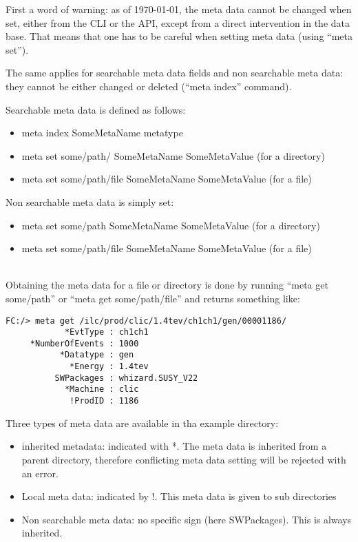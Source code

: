 \documentclass[a4paper,12pt]{article}
\begin{document}
First a word of warning: as of \today, the meta data cannot be changed when set,
either from the CLI or the API, except from a direct intervention in the data
base. That means that one has to be careful when setting meta data (using ``meta
set'').

The same applies for searchable meta data fields and non searchable meta data:
they cannot be either changed or deleted (``meta index'' command). 

Searchable meta data is defined as follows:
\begin{itemize}
  \item meta index SomeMetaName metatype 
  \item meta set some/path/ SomeMetaName SomeMetaValue (for a directory)
  \item meta set some/path/file SomeMetaName SomeMetaValue (for a file)
\end{itemize}

Non searchable meta data is simply set:
\begin{itemize}
  \item meta set some/path SomeMetaName SomeMetaValue (for a directory)
  \item meta set some/path/file SomeMetaName SomeMetaValue (for a file)
\end{itemize}

~\\

Obtaining the meta data for a file or directory is done by running ``meta get
some/path'' or ``meta get some/path/file'' and returns something like:
\begin{lstlisting}
FC:/> meta get /ilc/prod/clic/1.4tev/ch1ch1/gen/00001186/
            *EvtType : ch1ch1
     *NumberOfEvents : 1000
           *Datatype : gen
             *Energy : 1.4tev
          SWPackages : whizard.SUSY_V22
            *Machine : clic
             !ProdID : 1186
\end{lstlisting}
Three types of meta data are available in tha example directory: 
\begin{itemize}
  \item inherited metadata: indicated with *. The meta data is inherited from a
  parent directory, therefore conflicting meta data setting will be rejected
  with an error.
  \item Local meta data: indicated by !. This meta data is given to sub
  directories
  \item Non searchable meta data: no specific sign (here SWPackages). This is
  always inherited. 
\end{itemize}
\end{document}
